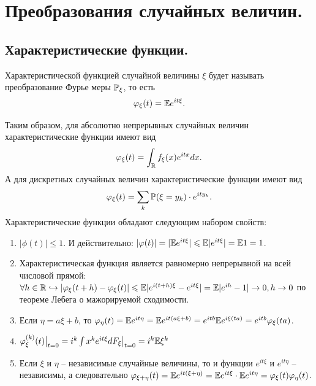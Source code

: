 \section{Преобразования случайных величин.}
\subsection{Характеристические функции.}
\begin{definition}
    Характеристической функцией случайной величины $\xi$ будет называть преобразование Фурье меры $\P_\xi$, то есть
    \[
        \phi_{\xi}(t) = \Ex e^{it \xi}.
    \]
\end{definition}
Таким образом, для абсолютно непрерывных случайных величин характеристические функции имеют вид
\[
    \phi_{\xi}(t) = \int_{\R} f_{\xi}(x)e^{itx}dx.
\]
А для дискретных случайных величин характеристические функции имеют вид
\[
    \phi_{\xi}(t) = \sum\limits_{k} \P(\xi = y_k)\cdot e^{ity_k}.
\]
Характеристические функции обладают следующим набором свойств:
\begin{enumerate}
    \item $|\phi(t)| \leq 1$. И действительно: $|\phi(t)| = |\Ex e^{it \xi}| \leq \Ex |e^{it \xi}| = \Ex 1 = 1$.
    \item Характеристическая функция является равномерно непрерывной на всей числовой прямой: $\forall h \in \R \hookrightarrow |\phi_\xi(t + h) - \phi_\xi(t)| \leq \Ex |e^{i(t + h)\xi} - e^{it \xi}| = \Ex |e^{ih} - 1| \ra 0, h \ra 0$ по теореме Лебега о мажорируемой сходимости.
    \item Если $\eta = a \xi + b$, то $\phi_{\eta}(t) = \Ex e^{it \eta} = \Ex e^{it (a \xi + b)} =e^{itb} \Ex e^{i\xi (ta)} = e^{itb}\phi_\xi (ta) $.
    \item $\phi^{(k)}_\xi(t)\big|_{t = 0} = i^k \int x^k e^{it \xi} dF_\xi \big|_{t = 0} = i^k\Ex \xi^k$
    \item Если $\xi$ и $\eta$ -- независимые случайные величины, то и функции $e^{it\xi}$ и $e^{it \eta}$ -- независимы, а следовательно $\phi_{\xi + \eta}(t) = \Ex e^{it (\xi + \eta)} = \Ex e^{it\xi}\cdot \Ex e^{it \eta} = \phi_\xi(t)\phi_\eta(t)$.
\end{enumerate}
